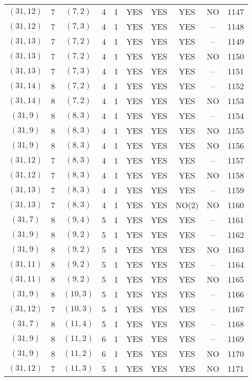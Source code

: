 \begin{longtable}{|c|c|c|c|c|c|c|c|c|c|}
$(31, 12)$ & 7 & $(7, 2)$ & 4 & 1 & YES & YES & YES & NO & 1147\\
$(31, 12)$ & 7 & $(7, 3)$ & 4 & 1 & YES & YES & YES & -- & 1148\\
$(31, 13)$ & 7 & $(7, 2)$ & 4 & 1 & YES & YES & YES & -- & 1149\\
$(31, 13)$ & 7 & $(7, 2)$ & 4 & 1 & YES & YES & YES & NO & 1150\\
$(31, 13)$ & 7 & $(7, 3)$ & 4 & 1 & YES & YES & YES & -- & 1151\\
$(31, 14)$ & 8 & $(7, 2)$ & 4 & 1 & YES & YES & YES & -- & 1152\\
$(31, 14)$ & 8 & $(7, 2)$ & 4 & 1 & YES & YES & YES & NO & 1153\\
$(31, 9)$ & 8 & $(8, 3)$ & 4 & 1 & YES & YES & YES & -- & 1154\\
$(31, 9)$ & 8 & $(8, 3)$ & 4 & 1 & YES & YES & YES & NO & 1155\\
$(31, 9)$ & 8 & $(8, 3)$ & 4 & 1 & YES & YES & YES & NO & 1156\\
$(31, 12)$ & 7 & $(8, 3)$ & 4 & 1 & YES & YES & YES & -- & 1157\\
$(31, 12)$ & 7 & $(8, 3)$ & 4 & 1 & YES & YES & YES & NO & 1158\\
$(31, 13)$ & 7 & $(8, 3)$ & 4 & 1 & YES & YES & YES & -- & 1159\\
$(31, 13)$ & 7 & $(8, 3)$ & 4 & 1 & YES & YES & NO(2) & NO & 1160\\
$(31, 7)$ & 8 & $(9, 4)$ & 5 & 1 & YES & YES & YES & -- & 1161\\
$(31, 9)$ & 8 & $(9, 2)$ & 5 & 1 & YES & YES & YES & -- & 1162\\
$(31, 9)$ & 8 & $(9, 2)$ & 5 & 1 & YES & YES & YES & NO & 1163\\
$(31, 11)$ & 8 & $(9, 2)$ & 5 & 1 & YES & YES & YES & -- & 1164\\
$(31, 11)$ & 8 & $(9, 2)$ & 5 & 1 & YES & YES & YES & NO & 1165\\
$(31, 9)$ & 8 & $(10, 3)$ & 5 & 1 & YES & YES & YES & -- & 1166\\
$(31, 12)$ & 7 & $(10, 3)$ & 5 & 1 & YES & YES & YES & -- & 1167\\
$(31, 7)$ & 8 & $(11, 4)$ & 5 & 1 & YES & YES & YES & -- & 1168\\
$(31, 9)$ & 8 & $(11, 2)$ & 6 & 1 & YES & YES & YES & -- & 1169\\
$(31, 9)$ & 8 & $(11, 2)$ & 6 & 1 & YES & YES & YES & NO & 1170\\
$(31, 12)$ & 7 & $(11, 3)$ & 5 & 1 & YES & YES & YES & NO & 1171\\

\end{longtable}
